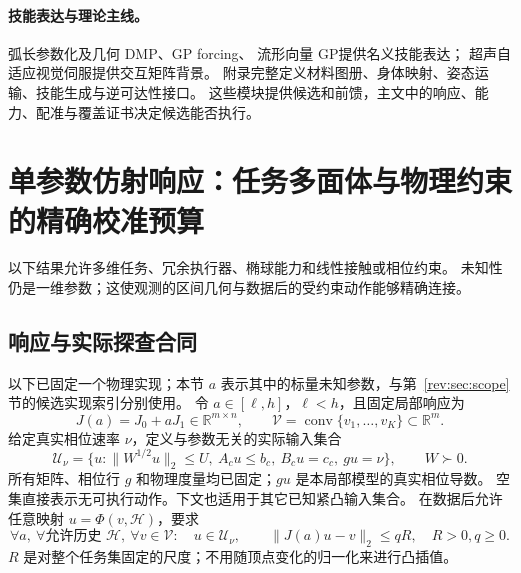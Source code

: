\documentclass[11pt,a4paper]{article}
\numberwithin{equation}{section}
\theoremstyle{definition}
\begin{document}
\paragraph{技能表达与理论主线。}
弧长参数化及几何 DMP\cite{aldmp2016,gdmp2024}、GP forcing\cite{gpdmp2026}、
流形向量 GP\cite{gpmanifold2021}提供名义技能表达；
超声自适应视觉伺服\cite{krupa2005}提供交互矩阵背景。
附录完整定义材料图册、身体映射、姿态运输、技能生成与逆可达性接口。
这些模块提供候选和前馈，主文中的响应、能力、配准与覆盖证书决定候选能否执行。


\section{单参数仿射响应：任务多面体与物理约束的精确校准预算}
\label{v44g:sec:polytope-frontier}

以下结果允许多维任务、冗余执行器、椭球能力和线性接触或相位约束。
未知性仍是一维参数；这使观测的区间几何与数据后的受约束动作能够精确连接。

\subsection{响应与实际探查合同}
以下已固定一个物理实现；本节 $a$ 表示其中的标量未知参数，与第~\ref{rev:sec:scope}节的候选实现索引分别使用。
令 $a\in[\ell,h]$，$\ell<h$，且固定局部响应为
\begin{equation}
 J(a)=J_0+aJ_1\in\mathbb R^{m\times n},\qquad
 \mathcal V=\operatorname{conv}\{v_1,\ldots,v_K\}\subset\mathbb R^m.
 \label{v44g:eq:model}
\end{equation}
给定真实相位速率 $\nu$，定义与参数无关的实际输入集合
\begin{equation}
 \mathcal U_\nu=
 \{u:\|W^{1/2}u\|_2\le U,\ A_cu\le b_c,\ B_cu=c_c,\ gu=\nu\},
 \qquad W\succ0.
 \label{v44g:eq:input-set}
\end{equation}
所有矩阵、相位行 $g$ 和物理度量均已固定；$gu$ 是本局部模型的真实相位导数。
空集直接表示无可执行动作。下文也适用于其它已知紧凸输入集合。
在数据后允许任意映射 $u=\Phi(v,\mathcal H)$，要求
\begin{equation}
 \forall a,\ \forall\text{允许历史 }\mathcal H,\ \forall v\in\mathcal V:
 \quad u\in\mathcal U_\nu,\qquad \|J(a)u-v\|_2\le qR,
 \quad R>0, q\ge0.
 \label{v44g:eq:response-contract}
\end{equation}
$R$ 是对整个任务集固定的尺度；不用随顶点变化的归一化来进行凸插值。
\end{document}

